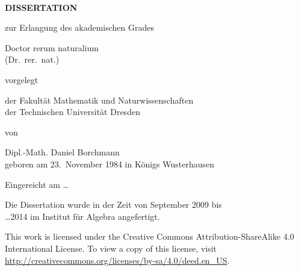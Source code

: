 
~\cleardoublepage

\begin{center}
  \vfill{}

  \Huge\makeatletter{\textbf{\@title}}\makeatother

  \vfill{}

  \LARGE
  \textbf{D\;I\;S\;S\;E\;R\;T\;A\;T\;I\;O\;N}

  \vspace*{2ex}
  zur Erlangung des akademischen Grades
  \vspace*{2ex}

  Doctor rerum naturalium \\
  (Dr.\ rer.\ nat.)

  \vfill

  vorgelegt

  \vfill

  der Fakultät Mathematik und Naturwissenschaften\\
  der Technischen Universität Dresden

  \vfill

  von

  \vfill

  {\large
    Dipl.-Math. Daniel Borchmann\\
    \vspace*{.7ex}
    geboren am 23.\ November 1984 in Königs Wusterhausen
  }

  \vfill

  Eingereicht am \dots

  \vfill

  \large

  Die Dissertation wurde in der Zeit von September 2009 bis\\
  \dots 2014 im Institut für Algebra angefertigt.
\end{center}

\newpage

\vspace*{\fill}

\noindent%
This work is licensed under the Creative Commons Attribution-ShareAlike 4.0 International
License. To view a copy of this license, visit
\url{http://creativecommons.org/licenses/by-sa/4.0/deed.en_US}.

